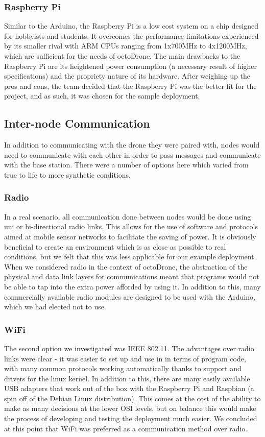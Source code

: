 \subsubsection{Raspberry Pi}
Similar to the Arduino, the Raspberry Pi is a low cost system on a chip designed for hobbyists and students. It overcomes the performance limitations experienced by its smaller rival with ARM CPUs ranging from 1x700MHz to 4x1200MHz\cite{rpiguide}, which are sufficient for the needs of octoDrone. The main drawbacks to the Raspberry Pi are its heightened power consumption (a necessary result of higher specifications) and the propriety nature of its hardware. After weighing up the pros and cons, the team decided that the Raspberry Pi was the better fit for the project, and as such, it was chosen for the sample deployment.

\subsection{Inter-node Communication}
In addition to communicating with the drone they were paired with, nodes would need to communicate with each other in order to pass messages and communicate with the base station. There were a number of options here which varied from true to life to more synthetic conditions.

\subsubsection{Radio}
In a real scenario, all communication done between nodes would be done using uni or bi-directional radio links. This allows for the use of software and protocols aimed at mobile sensor networks to facilitate the saving of power. It is obviously beneficial to create an environment which is as close as possible to real conditions, but we felt that this was less applicable for our example deployment. When we considered radio in the context of octoDrone, the abstraction of the physical and data link layers for communications meant that programs would not be able to tap into the extra power afforded by using it. In addition to this, many commercially available radio modules are designed to be used with the Arduino, which we had elected not to use.

\subsubsection{WiFi}
The second option we investigated was IEEE 802.11. The advantages over radio links were clear - it was easier to set up and use in in terms of program code, with many common protocols working automatically thanks to support and drivers for the linux kernel. In addition to this, there are many easily available USB adapters that work out of the box with the Raspberry Pi and Raspbian (a spin off of the Debian Linux distribution). This comes at the cost of the ability to make as many decisions at the lower OSI levels, but on balance this would make the process of developing and testing the deployment much easier. We concluded at this point that WiFi was preferred as a communication method over radio.

